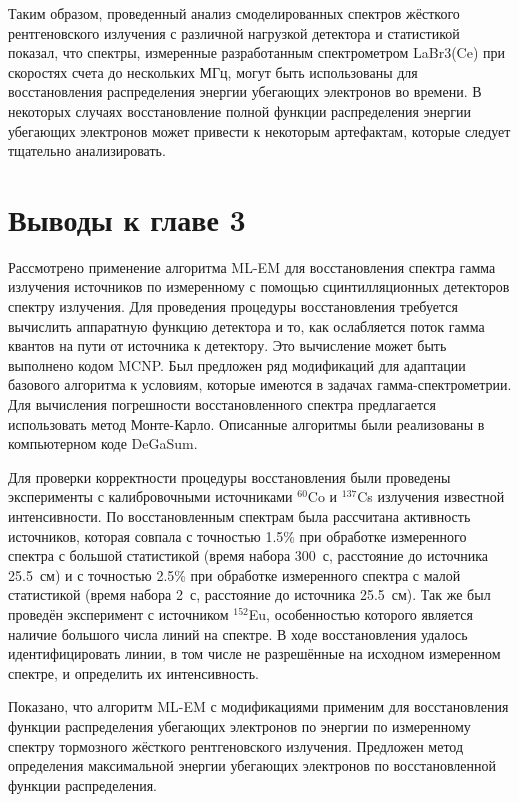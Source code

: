 Таким образом, проведенный анализ смоделированных спектров жёсткого рентгеновского излучения с различной нагрузкой детектора и статистикой показал, что спектры, измеренные разработанным спектрометром LaBr3(Ce) при скоростях счета до нескольких МГц, могут быть использованы для восстановления распределения энергии убегающих электронов во времени. В некоторых случаях восстановление полной функции распределения энергии убегающих электронов может привести к некоторым артефактам, которые следует тщательно анализировать. 


\section{Выводы к главе 3}

Рассмотрено применение алгоритма ML-EM для восстановления спектра гамма излучения источников по измеренному с помощью сцинтилляционных детекторов спектру излучения. Для проведения процедуры восстановления требуется вычислить аппаратную функцию детектора и то, как ослабляется поток гамма квантов на пути от источника к детектору. Это вычисление может быть выполнено кодом MCNP. Был предложен ряд модификаций для адаптации базового алгоритма к условиям, которые имеются в задачах гамма-спектрометрии. Для вычисления погрешности восстановленного спектра предлагается использовать метод Монте-Карло. Описанные алгоритмы были реализованы в компьютерном коде DeGaSum.

Для проверки корректности процедуры восстановления были проведены эксперименты с калибровочными источниками ${}^{60}$Co и ${}^{137}$Cs излучения известной интенсивности. По восстановленным спектрам была рассчитана активность источников, которая совпала с точностью 1.5\% при обработке измеренного спектра с большой статистикой (время набора 300~с, расстояние до источника 25.5~см) и с точностью 2.5\% при обработке измеренного спектра с малой статистикой (время набора 2~с, расстояние до источника 25.5~см). Так же был проведён эксперимент с источником ${}^{152}$Eu, особенностью которого является наличие большого числа линий на спектре. В ходе восстановления удалось идентифицировать линии, в том числе не разрешённые на исходном измеренном спектре, и определить их интенсивность.  

Показано, что алгоритм ML-EM с модификациями применим для восстановления функции распределения убегающих электронов по энергии по измеренному спектру тормозного жёсткого рентгеновского излучения. Предложен метод определения максимальной энергии убегающих электронов по восстановленной функции распределения. 

